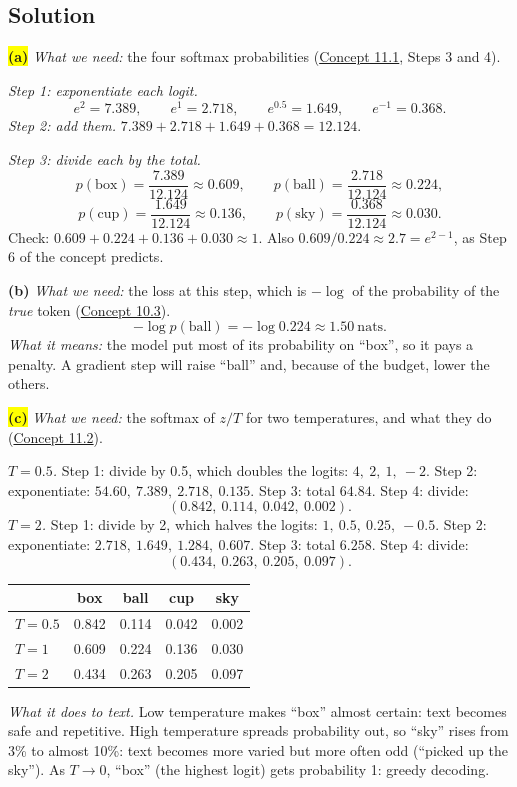 \documentclass[12pt,a4paper]{article}
\begin{document}
\subsection{Solution}

\colorbox{yellow}{\textbf{(a)}} \emph{What we need:} the four softmax probabilities (\hyperref[c11-1]{Concept 11.1}, Steps 3 and 4).

\emph{Step 1: exponentiate each logit.}
\[
e^{2}=7.389,\qquad e^{1}=2.718,\qquad e^{0.5}=1.649,\qquad e^{-1}=0.368 .
\]
\emph{Step 2: add them.} $7.389+2.718+1.649+0.368=12.124$.

\emph{Step 3: divide each by the total.}
\[
p(\text{box})=\frac{7.389}{12.124}\approx0.609,\qquad p(\text{ball})=\frac{2.718}{12.124}\approx0.224,
\]
\[
p(\text{cup})=\frac{1.649}{12.124}\approx0.136,\qquad p(\text{sky})=\frac{0.368}{12.124}\approx0.030 .
\]
Check: $0.609+0.224+0.136+0.030\approx1$. Also $0.609/0.224\approx2.7=e^{2-1}$, as Step 6 of the concept predicts.

\textbf{(b)} \emph{What we need:} the loss at this step, which is $-\log$ of the probability of the \emph{true} token (\hyperref[c10-3]{Concept 10.3}).
\[
-\log p(\text{ball})=-\log0.224\approx1.50\ \text{nats}.
\]
\emph{What it means:} the model put most of its probability on ``box'', so it pays a penalty. A gradient step will raise ``ball'' and, because of the budget, lower the others.

\colorbox{yellow}{\textbf{(c)}} \emph{What we need:} the softmax of $z/T$ for two temperatures, and what they do (\hyperref[c11-2]{Concept 11.2}).

\emph{$T=0.5$.} Step 1: divide by 0.5, which doubles the logits: $4,\ 2,\ 1,\ -2$. Step 2: exponentiate: $54.60,\ 7.389,\ 2.718,\ 0.135$. Step 3: total $64.84$. Step 4: divide:
\[
(0.842,\ 0.114,\ 0.042,\ 0.002).
\]
\emph{$T=2$.} Step 1: divide by 2, which halves the logits: $1,\ 0.5,\ 0.25,\ -0.5$. Step 2: exponentiate: $2.718,\ 1.649,\ 1.284,\ 0.607$. Step 3: total $6.258$. Step 4: divide:
\[
(0.434,\ 0.263,\ 0.205,\ 0.097).
\]
\begin{center}
\begin{tabular}{@{}lcccc@{}}
\toprule
 & box & ball & cup & sky \\
\midrule
$T=0.5$ & 0.842 & 0.114 & 0.042 & 0.002 \\
$T=1$ & 0.609 & 0.224 & 0.136 & 0.030 \\
$T=2$ & 0.434 & 0.263 & 0.205 & 0.097 \\
\bottomrule
\end{tabular}
\end{center}
\emph{What it does to text.} Low temperature makes ``box'' almost certain: text becomes safe and repetitive. High temperature spreads probability out, so ``sky'' rises from 3\% to almost 10\%: text becomes more varied but more often odd (``picked up the sky''). As $T\to0$, ``box'' (the highest logit) gets probability 1: greedy decoding.
\end{document}
